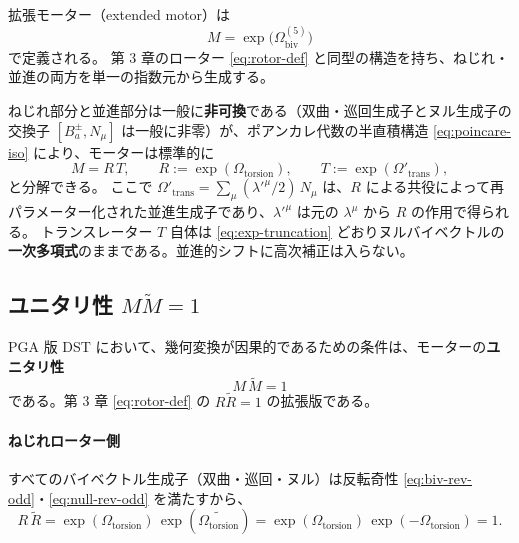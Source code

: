 \documentclass[dvipdfmx,a4paper,oneside]{jsbook}
\numberwithin{equation}{chapter}
\begin{document}
拡張モーター（extended motor）は
\begin{equation}
  M = \exp\!\bigl(\Omega_{\mathrm{biv}}^{(5)}\bigr)
  \label{eq:extended-motor}
\end{equation}
で定義される。
第 3 章のローター \eqref{eq:rotor-def} と同型の構造を持ち、ねじれ・並進の両方を単一の指数元から生成する。

ねじれ部分と並進部分は一般に\textbf{非可換}である（双曲・巡回生成子とヌル生成子の交換子 \([B_a^{\pm}, N_\mu]\) は一般に非零）が、ポアンカレ代数の半直積構造 \eqref{eq:poincare-iso} により、モーターは標準的に
\begin{equation}
  M = R\, T,
  \qquad
  R := \exp(\Omega_{\mathrm{torsion}}),
  \qquad
  T := \exp(\Omega'_{\mathrm{trans}}),
  \label{eq:motor-factor}
\end{equation}
と分解できる。
ここで \(\Omega'_{\mathrm{trans}} = \sum_\mu (\lambda'^{\mu}/2)\, N_\mu\) は、\(R\) による共役によって再パラメーター化された並進生成子であり、\(\lambda'^{\mu}\) は元の \(\lambda^\mu\) から \(R\) の作用で得られる。
トランスレーター \(T\) 自体は \eqref{eq:exp-truncation} どおりヌルバイベクトルの\textbf{一次多項式}のままである。並進的シフトに高次補正は入らない。

\subsection{ユニタリ性 \(M\widetilde{M} = 1\)}

PGA 版 DST において、幾何変換が因果的であるための条件は、モーターの\textbf{ユニタリ性}
\begin{equation}
  M\,\widetilde{M} = 1
  \label{eq:motor-unitarity}
\end{equation}
である。第 3 章 \eqref{eq:rotor-def} の \(R\widetilde{R} = 1\) の拡張版である。

\paragraph{ねじれローター側}
すべてのバイベクトル生成子（双曲・巡回・ヌル）は反転奇性 \eqref{eq:biv-rev-odd}・\eqref{eq:null-rev-odd} を満たすから、
\begin{equation}
  R\,\widetilde{R}
  = \exp(\Omega_{\mathrm{torsion}})\,\exp(\widetilde{\Omega_{\mathrm{torsion}}})
  = \exp(\Omega_{\mathrm{torsion}})\,\exp(-\Omega_{\mathrm{torsion}})
  = 1.
\end{equation}
\end{document}
